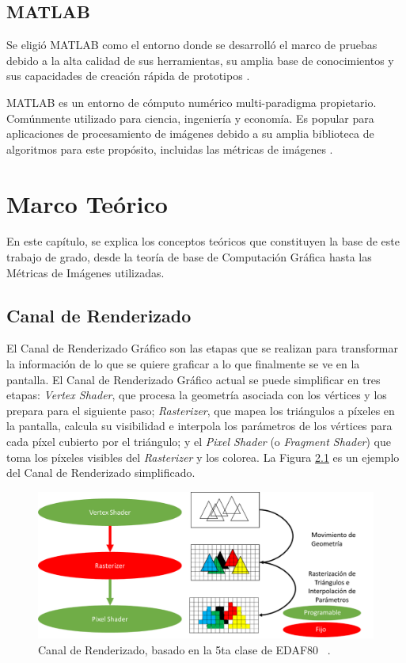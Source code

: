 \documentclass[pregrado]{tesis-usb} %
\begin{document}
\section{MATLAB}
Se eligió MATLAB como el entorno donde se desarrolló el marco de pruebas debido a la alta calidad de sus herramientas, su amplia base de conocimientos y sus capacidades de creación rápida de prototipos \cite{Doggett2017EDAF80, themathworks2018}.

MATLAB es un entorno de cómputo numérico multi-paradigma propietario. Comúnmente utilizado para ciencia, ingeniería y economía. Es popular para aplicaciones de procesamiento de imágenes debido a su amplia biblioteca de algoritmos para este propósito, incluidas las métricas de imágenes \cite{Doggett2017EDAF80, themathworks2018}.



\chapter{Marco Teórico}
En este capítulo, se explica los conceptos teóricos que constituyen la base de este trabajo de grado, desde la teoría de base de Computación Gráfica hasta las Métricas de Imágenes utilizadas.

\section{Canal de Renderizado}
El Canal de Renderizado Gráfico son las etapas que se realizan para transformar la información de lo que se quiere graficar a lo que finalmente se ve en la pantalla. El Canal de Renderizado Gráfico actual se puede simplificar en tres etapas: \textit{Vertex Shader}, que procesa la geometría asociada con los vértices y los prepara para el siguiente paso; \textit{Rasterizer}, que mapea los triángulos a píxeles en la pantalla, calcula su visibilidad e interpola los parámetros de los vértices para cada píxel cubierto por el triángulo; y el \textit{Pixel Shader} (o \textit{Fragment Shader}) que toma los píxeles visibles del \textit{Rasterizer} y los colorea. La Figura \ref{fig:graphpipeline} es un ejemplo del Canal de Renderizado simplificado.

\begin{figure}[!hbt]
	\centering
	\includegraphics[scale=0.7]{images/graphics_pipeline.png} 
	\caption{Canal de Renderizado, basado en la 5ta clase de EDAF80 ~\cite{Doggett2017EDAF80}.}\label{fig:graphpipeline}
\end{figure}
\end{document}
